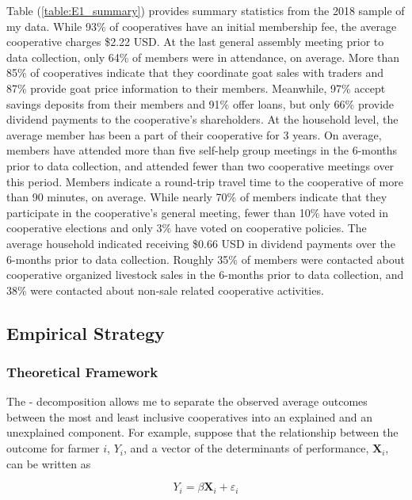 \documentclass[11pt]{article}
\begin{document}
Table (\ref{table:E1_summary}) provides summary statistics from the 2018 sample of my data. While 93\% of cooperatives have an initial membership fee, the average cooperative charges \$2.22 USD. At the last general assembly meeting prior to data collection, only 64\% of members were in attendance, on average. More than 85\% of cooperatives indicate that they coordinate goat sales with traders and 87\% provide goat price information to their members. Meanwhile, 97\% accept savings deposits from their members and 91\% offer loans, but only 66\% provide dividend payments to the cooperative's shareholders. At the household level, the average member has been a part of their cooperative for 3 years. On average, members have attended more than five self-help group meetings in the 6-months prior to data collection, and attended fewer than two cooperative meetings over this period. Members indicate a round-trip travel time to the cooperative of more than 90 minutes, on average. While nearly 70\% of members indicate that they participate in the cooperative's general meeting, fewer than 10\% have voted in cooperative elections and only 3\% have voted on cooperative policies. The average household indicated receiving \$0.66 USD in dividend payments over the 6-months prior to data collection. Roughly 35\% of members were contacted about cooperative organized livestock sales in the 6-months prior to data collection, and 38\% were contacted about non-sale related cooperative activities. 


\subsection{Empirical Strategy} \label{sec:E1_emp}

\subsubsection{Theoretical Framework} \label{sec:E1_theory}

The \citet{oaxaca73}-\citet{blinder73} decomposition allows me to separate the observed average outcomes between the most and least inclusive cooperatives into an explained and an unexplained component. For example, suppose that the relationship between the outcome for farmer $i$, $Y_i$, and a vector of the determinants of performance, $\mathbf{X}_i$, can be written as

\begin{equation} \label{eq:E1_1}
    Y_i = \beta \mathbf{X}_i + \varepsilon_i
\end{equation}  
\end{document}
